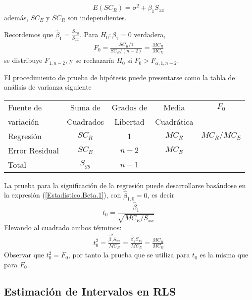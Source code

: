 \begin{Prop}
\begin{equation}
E\left(SC_{R}\right)=\sigma^{2}+\beta_{1}S_{xx}
\end{equation}
adem\'as, $SC_{E}$ y $SC_{R}$ son independientes.
\end{Prop}




Recordemos que $\hat{\beta}_{1}=\frac{S_{xy}}{S_{xx}}$. Para $H_{0}:\beta_{1}=0$ verdadera,
\begin{eqnarray*}
F_{0}=\frac{SC_{R}/1}{SC_{E}/(n-2)}=\frac{MC_{R}}{MC_{E}}
\end{eqnarray*}
se distribuye $F_{1,n-2}$, y se rechazar\'ia $H_{0}$ si $F_{0}>F_{\alpha,1,n-2}$.
									
El procedimiento de prueba de hip\'otesis puede presentarse como la tabla de an\'alisis de varianza siguiente\medskip

\begin{tabular}{lcccc}\hline
Fuente de & Suma de  &  Grados de  & Media  & $F_{0}$ \\ 
 variaci\'on & Cuadrados & Libertad & Cuadr\'atica & \\\hline
 Regresi\'on & $SC_{R}$ & 1 & $MC_{R}$  & $MC_{R}/MC_{E}$\\
 Error Residual & $SC_{E}$ & $n-2$ & $MC_{E}$ & \\\hline
 Total & $S_{yy}$ & $n-1$ & & \\\hline
\end{tabular} 





La prueba para la significaci\'on de la regresi\'on puede desarrollarse bas\'andose en la expresi\'on (\ref{Estadistico.Beta.1}), con $\hat{\beta}_{1,0}=0$, es decir
\begin{equation}\label{Estadistico.Beta.1.Cero}
t_{0}=\frac{\hat{\beta}_{1}}{\sqrt{MC_{E}/S_{xx}}}
\end{equation}
Elevando al cuadrado ambos t\'erminos:
\begin{eqnarray*}
t_{0}^{2}=\frac{\hat{\beta}_{1}^{2}S_{xx}}{MC_{E}}=\frac{\hat{\beta}_{1}S_{xy}}{MC_{E}}=\frac{MC_{R}}{MC_{E}}
\end{eqnarray*}
Observar que $t_{0}^{2}=F_{0}$, por tanto la prueba que se utiliza para $t_{0}$ es la misma que para $F_{0}$.





\subsection{Estimaci\'on de Intervalos en RLS}



